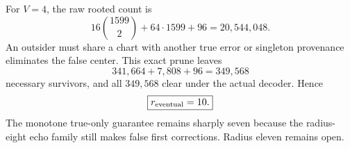 For $V=4$, the raw rooted count is
\[
 16\binom{1599}{2}+64\cdot1599+96=20{,}544{,}048.
\]
An outsider must share a chart with another true error or singleton provenance
eliminates the false center.  This exact prune leaves
\[
 341{,}664+7{,}808+96=\boxed{349{,}568}
\]
necessary survivors, and all $349{,}568$ clear under the actual decoder.  Hence
\[
 \boxed{r_{\rm eventual}=10.}
\]
The monotone true-only guarantee remains sharply seven because the radius-eight
echo family still makes false first corrections.  Radius eleven remains open.
